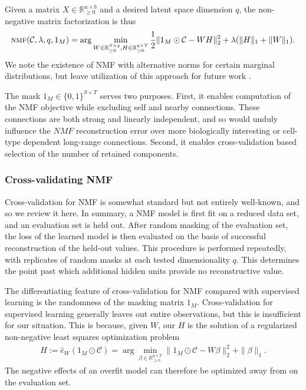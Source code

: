 Given a matrix $X \in \mathbb R_{\geq 0}^{a \times b}$ and a desired latent space dimension $q$, the non-negative matrix factorization is thus
\begin{eqnarray*}
\textsc{nmf} (\mathcal C, \lambda, q,1_{M}) = \arg \min_{W \in \mathbb R_{\geq 0}^{S \times q}, H\in \mathbb R_{\geq 0}^{q \times T}} \frac{1}{2}\| 1_{M} \odot \mathcal C - WH\|_2^2  + \lambda  (\|H \|_1 + \|W \|_1) .
\end{eqnarray*}
We note the existence of NMF with alternative norms for certain marginal distributions, but leave utilization of this approach for future work \citep{Brunet2004-gi}.

The mask $1_M \in \{0,1\}^{S \times T}$ serves two purposes.
First, it enables computation of the NMF objective while excluding self and nearby connections.
These connections are both strong and linearly independent, and so would unduly influence the $NMF$ reconstruction error over more biologically interesting or cell-type dependent long-range connections.
Second, it enables cross-validation based selection of the number of retained components.

\subsubsection{Cross-validating NMF}

Cross-validation for NMF is somewhat standard but not entirely well-known, and so we review it here.
In summary, a NMF model is first fit on a reduced data set, and an evaluation set is held out.
After random masking of the evaluation set, the loss of the learned model is then evaluated on the basis of successful reconstruction of the held-out values.
This procedure is performed repeatedly, with replicates of random masks at each tested dimensionality $q$.
This determines the point past which additional hidden units provide no reconstructive value.

The differentiating feature of cross-validation for NMF compared with supervised learning is the randomness of the masking matrix $1_M$.
Cross-validation for supervised learning generally leaves out entire observations, but this is insufficient for our situation.
This is because, given $W$, our $H$ is the solution of a regularized non-negative least squares optimization problem
\begin{eqnarray}
H := \widehat e_W(1_{M} \odot \mathcal C) = \arg \min_{\beta \in \mathbb R_{\geq 0}^{q \times T}} \|1_{M} \odot \mathcal C - W \beta\|_2^2 + \|\beta\|_1.
\label{eq:nmf_nnls}
\end{eqnarray}
The negative effects of an overfit model can therefore be optimized away from on the evaluation set.

